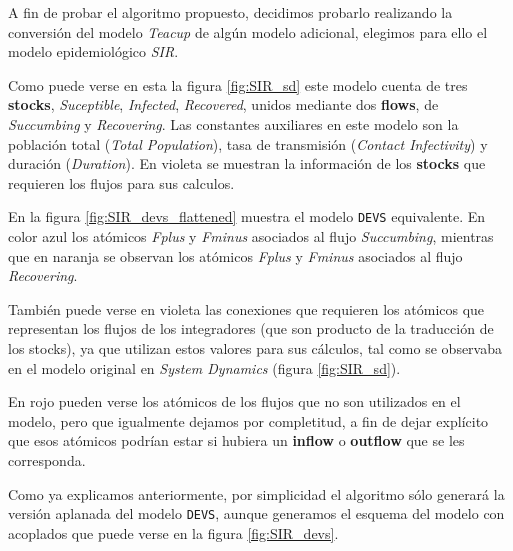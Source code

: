 
A fin de probar el algoritmo propuesto, decidimos probarlo realizando la conversión del modelo \textit{Teacup} de algún modelo adicional, elegimos para ello el modelo epidemiológico \textit{SIR}.

Como puede verse en esta la figura \ref{fig:SIR_sd} este modelo cuenta de tres \textbf{stocks}, \textit{Suceptible}, \textit{Infected}, \textit{Recovered}, unidos mediante dos \textbf{flows}, de  \textit{Succumbing} y \textit{Recovering}. Las constantes auxiliares en este modelo son la población total (\textit{Total Population}), tasa de transmisión (\textit{Contact Infectivity}) y duración (\textit{Duration}). En violeta se muestran la información de los \textbf{stocks} que requieren los flujos para sus calculos.

En la figura \ref{fig:SIR_devs_flattened} muestra el modelo \texttt{DEVS} equivalente. En color azul los atómicos \textit{Fplus} y \textit{Fminus} asociados al flujo \textit{Succumbing}, mientras que en naranja se observan los atómicos \textit{Fplus} y \textit{Fminus} asociados al flujo \textit{Recovering}. 

También puede verse en violeta  las conexiones que requieren los atómicos que representan los flujos de los integradores (que son producto de la traducción de los stocks), ya que utilizan estos valores para sus cálculos, tal como se observaba en el modelo original en \textit{System Dynamics} (figura \ref{fig:SIR_sd}). 

En rojo pueden verse los atómicos de los flujos que no son utilizados en el modelo, pero que igualmente dejamos por completitud, a fin de dejar explícito que esos atómicos podrían estar si hubiera un \textbf{inflow} o \textbf{outflow} que se les corresponda.

Como ya explicamos anteriormente, por simplicidad el algoritmo sólo generará la versión aplanada del modelo \texttt{DEVS}, aunque generamos el esquema del modelo con acoplados que puede verse en la figura \ref{fig:SIR_devs}.


